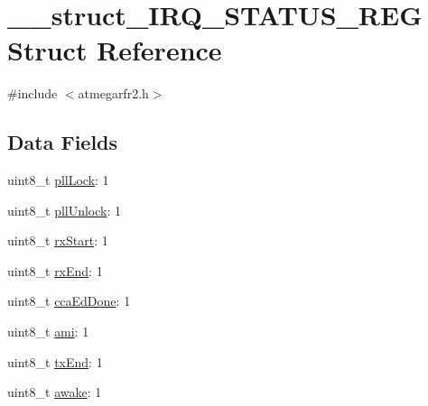 \hypertarget{struct____struct___i_r_q___s_t_a_t_u_s___r_e_g}{\section{\-\_\-\-\_\-struct\-\_\-\-I\-R\-Q\-\_\-\-S\-T\-A\-T\-U\-S\-\_\-\-R\-E\-G Struct Reference}
\label{struct____struct___i_r_q___s_t_a_t_u_s___r_e_g}
}


{\ttfamily \#include $<$atmegarfr2.\-h$>$}

\subsection*{Data Fields}
\begin{DoxyCompactItemize}
\item 
uint8\-\_\-t \hyperlink{struct____struct___i_r_q___s_t_a_t_u_s___r_e_g_a1bbe8d8beff26782805454127c9d1979}{pll\-Lock}\-: 1
\item 
uint8\-\_\-t \hyperlink{struct____struct___i_r_q___s_t_a_t_u_s___r_e_g_aa05c78cee04ab8ea08254480ef2f46e7}{pll\-Unlock}\-: 1
\item 
uint8\-\_\-t \hyperlink{struct____struct___i_r_q___s_t_a_t_u_s___r_e_g_ac45f7383d64102309e5eb128b52293ba}{rx\-Start}\-: 1
\item 
uint8\-\_\-t \hyperlink{struct____struct___i_r_q___s_t_a_t_u_s___r_e_g_a0ca8c1d2771c2f51edff5582913adc77}{rx\-End}\-: 1
\item 
uint8\-\_\-t \hyperlink{struct____struct___i_r_q___s_t_a_t_u_s___r_e_g_a87d21b8cdc899ea1fabc6a7c885d3207}{cca\-Ed\-Done}\-: 1
\item 
uint8\-\_\-t \hyperlink{struct____struct___i_r_q___s_t_a_t_u_s___r_e_g_ae3f7ec4476be7071a5a0b4929eafe516}{ami}\-: 1
\item 
uint8\-\_\-t \hyperlink{struct____struct___i_r_q___s_t_a_t_u_s___r_e_g_ae0651cfa44aef5edc1e6d2400daa40ed}{tx\-End}\-: 1
\item 
uint8\-\_\-t \hyperlink{struct____struct___i_r_q___s_t_a_t_u_s___r_e_g_ada784722eb424bcbe7ce4a0aa0938c4e}{awake}\-: 1
\end{DoxyCompactItemize}


